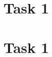 \documentclass{article}
\numberwithin{equation}{section}
\begin{document}

\section{Task 1}  %
\section{Task 1} \newpage  %
\newpage  %
\newpage  %
\end{document}
